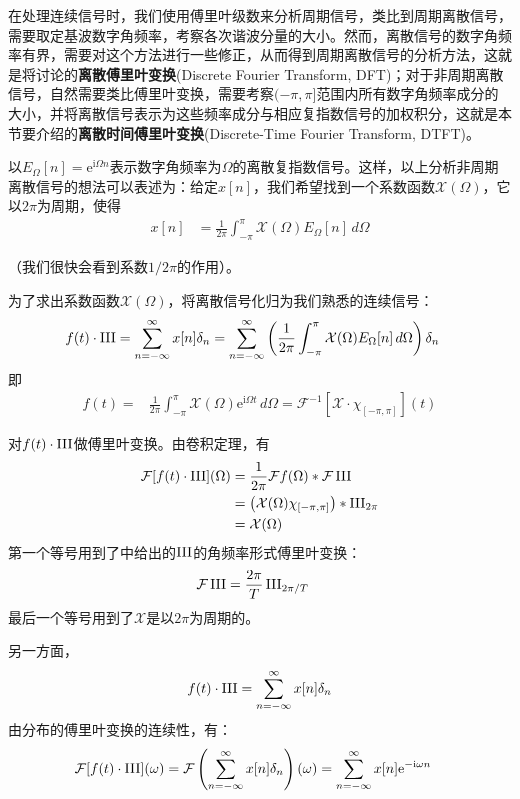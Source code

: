 在处理连续信号时，我们使用傅里叶级数来分析周期信号，类比到周期离散信号，需要取定基波数字角频率，考察各次谐波分量的大小。然而，离散信号的数字角频率有界，需要对这个方法进行一些修正，从而得到周期离散信号的分析方法，这就是将讨论的\textbf{离散傅里叶变换}(Discrete Fourier Transform, DFT)；对于非周期离散信号，自然需要类比傅里叶变换，需要考察$(-\pi,\pi]$范围内所有数字角频率成分的大小，并将离散信号表示为这些频率成分与相应复指数信号的加权积分，这就是本节要介绍的\textbf{离散时间傅里叶变换}(Discrete-Time Fourier Transform, DTFT)。

以$E_{\Omega}[n]=\mathrm{e}^{\mathrm{i}\Omega n}$表示数字角频率为$\Omega$的离散复指数信号。这样，以上分析非周期离散信号的想法可以表述为：给定$x[n]$，我们希望找到一个系数函数$\mathcal{X} (\Omega)$，它以$2\pi$为周期，使得\begin{align*}
    x[n]&=\frac{1}{2\pi}\int_{-\pi}^{\pi}\mathcal{X} (\Omega)E_{\Omega}[n]\,d\Omega
\end{align*}

（我们很快会看到系数$1/2\pi$的作用）。

为了求出系数函数$\mathcal{X} (\Omega)$，将离散信号化归为我们熟悉的连续信号：
\begin{align*}
    f(t)\cdot\operatorname{III}&=\sum_{n=-\infty}^{\infty}x[n]\delta_{n}=\sum_{n=-\infty}^{\infty}\left(\frac{1}{2\pi}\int_{-\pi}^{\pi}\mathcal{X} (\Omega)E_{\Omega}[n]\,d\Omega\right)\delta_{n}
\end{align*}
即\begin{align*}
    f(t)=&\frac{1}{2\pi}\int_{-\pi}^{\pi}\mathcal{X} (\Omega)\mathrm{e}^{\mathrm{i}\Omega t}\,d\Omega=\mathcal{F} ^{-1}[\mathcal{X}\cdot\chi_{[-\pi,\pi]}](t)
\end{align*}

对$f(t)\cdot\operatorname{III}$做傅里叶变换。由卷积定理，有
\begin{align*}
    \mathcal{F} [f(t)\cdot\operatorname{III}](\Omega)&=\frac{1}{2\pi}\mathcal{F} f(\Omega)*\mathcal{F} \operatorname{III}\\
    &=\left(\mathcal{X} (\Omega)\chi_{[-\pi,\pi]}\right)*\operatorname{III}_{2\pi}\\
    &=\mathcal{X} (\Omega)
\end{align*}
第一个等号用到了中给出的$\operatorname{III}$的角频率形式傅里叶变换：
{\color{red}\begin{align*}
    \mathcal{F} \operatorname{III}&=\frac{2\pi}{T}\operatorname{III}_{2\pi/T}
\end{align*}}
最后一个等号用到了$\mathcal{X} $是以$2\pi$为周期的。

另一方面，
$$f(t)\cdot\operatorname{III}=\sum_{n=-\infty}^{\infty}x[n]\delta_{n}$$
由分布的傅里叶变换的连续性，有：
\begin{align*}
    \mathcal{F} [f(t)\cdot\operatorname{III}](\omega)&=\mathcal{F} \left(\sum_{n=-\infty}^{\infty}x[n]\delta_{n}\right)(\omega)=\sum_{n=-\infty}^{\infty}x[n]\mathrm{e}^{-\mathrm{i}\omega n}
\end{align*}

